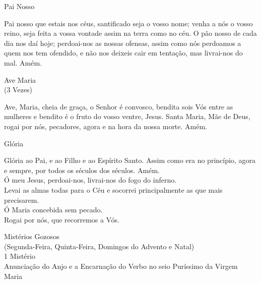 \documentclass{book}
\begin{document}
\begin{center}
    Pai Nosso
\end{center}
\begin{flushleft}
    Pai nosso que estais nos céus, santificado seja o vosso nome; venha a nós o vosso reino, seja feita a vossa vontade assim na terra como no céu. O pão nosso de cada dia nos daí hoje; perdoai-nos as nossas ofensas, assim como nós perdoamos a quem nos tem ofendido, e não nos deixeis cair em tentação, mas livrai-nos do mal. Amém.
\end{flushleft}
\begin{center}
    Ave Maria \\ \textcolor{VioletRed2}{\scriptsize{(3 Vezes)}}
\end{center}
\begin{flushleft}
    Ave, Maria, cheia de graça, o Senhor é convosco, bendita sois Vós entre as mulheres e bendito é o fruto do vosso ventre, Jesus. Santa Maria, Mãe de Deus, rogai por nós, pecadores, agora e na hora da nossa morte. Amém.
\end{flushleft}
\begin{center}
    Glória
\end{center}
\begin{flushleft}
    Glória ao Pai, e ao Filho e ao Espírito Santo. Assim como era no princípio, agora e sempre, por todos os séculos dos séculos. Amém.
    \vspace{.2cm} \\
    \VbarRed{} Ó meu Jesus, perdoai-nos, livrai-nos do fogo do inferno. \\
    \RbarRed{} Levai as almas todas para o Céu e socorrei principalmente as que mais precisarem.
    \vspace{.2cm} \\
    \VbarRed{} Ó Maria concebida sem pecado.\\
    \RbarRed{} Rogai por nós, que recorremos a Vós.
\end{flushleft}
\newpage
\begin{center}
    Mistérios Gozosos \\ \textcolor{VioletRed2}{\scriptsize{(Segunda-Feira, Quinta-Feira, Domingos do Advento e Natal)}} \\
    \hfill{} \break{}
    1\textordmasculine{} Mistério \\ Anunciação do Anjo e a Encarnação do Verbo no seio Puríssimo da Virgem Maria
\end{center}
\end{document}
